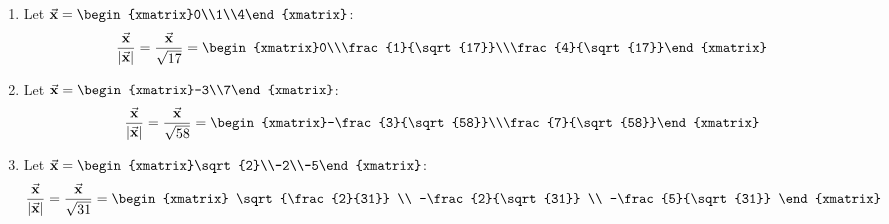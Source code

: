 \begin{exercise}{3}
  \begin{enumerate}
    \item Let $\Vect{x} = \begin{xmatrix}0\\1\\4\end{xmatrix}$:
          $$\frac{\Vect{x}}{|\Vect{x}|}=
            \frac{\Vect{x}}{\sqrt{17}}=
            \begin{xmatrix}0\\\frac{1}{\sqrt{17}}\\\frac{4}{\sqrt{17}}\end{xmatrix}$$

    \item Let $\Vect{x} = \begin{xmatrix}-3\\7\end{xmatrix}$:
          $$\frac{\Vect{x}}{|\Vect{x}|}=
            \frac{\Vect{x}}{\sqrt{58}}=
            \begin{xmatrix}-\frac{3}{\sqrt{58}}\\\frac{7}{\sqrt{58}}\end{xmatrix}$$

    \item Let $\Vect{x} = \begin{xmatrix}\sqrt{2}\\-2\\-5\end{xmatrix}$:
          $$\frac{\Vect{x}}{|\Vect{x}|}=
            \frac{\Vect{x}}{\sqrt{31}}=
            \begin{xmatrix}
              \sqrt{\frac{2}{31}} \\
              -\frac{2}{\sqrt{31}} \\
              -\frac{5}{\sqrt{31}}
            \end{xmatrix}$$
  \end{enumerate}
\end{exercise}

